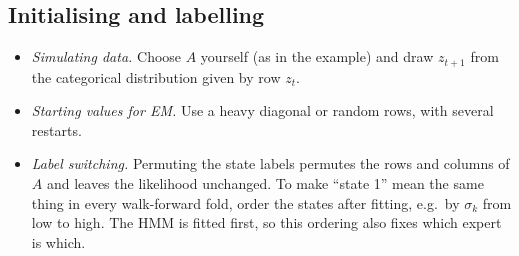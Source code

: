 \subsection{Initialising and labelling}
\begin{itemize}
  \item \emph{Simulating data.} Choose $A$ yourself (as in the example) and draw $z_{t+1}$ from the categorical distribution given by row $z_t$.
  \item \emph{Starting values for EM.} Use a heavy diagonal or random rows, with several restarts.
  \item \emph{Label switching.} Permuting the state labels permutes the rows and columns of $A$ and leaves the likelihood unchanged. To make ``state 1'' mean the same thing in every walk-forward fold, order the states after fitting, e.g.\ by $\sigma_k$ from low to high. The HMM is fitted first, so this ordering also fixes which expert is which.
\end{itemize}
\newpage
